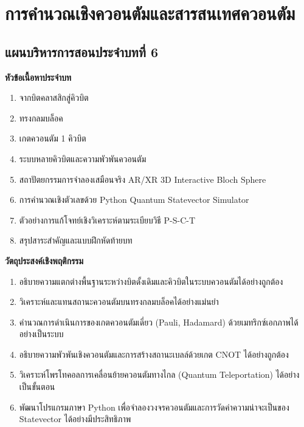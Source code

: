 \chapter{การคำนวณเชิงควอนตัมและสารสนเทศควอนตัม}
\label{chap:quantum_computing}

\section*{แผนบริหารการสอนประจำบทที่ 6}


\begin{lessonplanbox}
\noindent\textbf{หัวข้อเนื้อหาประจำบท}
\begin{enumerate}
    \item จากบิตคลาสสิกสู่คิวบิต
    \item ทรงกลมบล็อค
    \item เกตควอนตัม 1 คิวบิต
    \item ระบบหลายคิวบิตและความพัวพันควอนตัม
    \item สถาปัตยกรรมการจำลองเสมือนจริง AR/XR 3D Interactive Bloch Sphere
    \item การคำนวณเชิงตัวเลขด้วย Python Quantum Statevector Simulator
    \item ตัวอย่างการแก้โจทย์เชิงวิเคราะห์ตามระเบียบวิธี P-S-C-T
    \item สรุปสาระสำคัญและแบบฝึกหัดท้ายบท
\end{enumerate}

\noindent\textbf{วัตถุประสงค์เชิงพฤติกรรม}
\begin{enumerate}
    \item อธิบายความแตกต่างพื้นฐานระหว่างบิตดั้งเดิมและคิวบิตในระบบควอนตัมได้อย่างถูกต้อง
    \item วิเคราะห์และแทนสถานะควอนตัมบนทรงกลมบล็อคได้อย่างแม่นยำ
    \item คำนวณการดำเนินการของเกตควอนตัมเดี่ยว (Pauli, Hadamard) ด้วยเมทริกซ์เอกภาพได้อย่างเป็นระบบ
    \item อธิบายความพัวพันเชิงควอนตัมและการสร้างสถานะเบลล์ด้วยเกต CNOT ได้อย่างถูกต้อง
    \item วิเคราะห์โพรโทคอลการเคลื่อนย้ายควอนตัมทางไกล (Quantum Teleportation) ได้อย่างเป็นขั้นตอน
    \item พัฒนาโปรแกรมภาษา Python เพื่อจำลองวงจรควอนตัมและการวัดค่าความน่าจะเป็นของ Statevector ได้อย่างมีประสิทธิภาพ
\end{enumerate}


\end{lessonplanbox}

